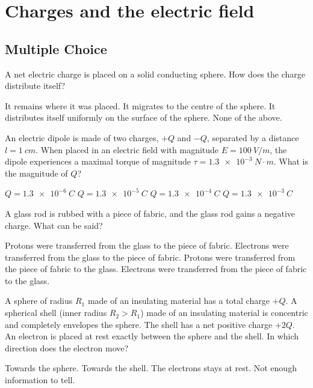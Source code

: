 \section{Charges and the electric field}

\subsection{Multiple Choice}

\question A net electric charge is placed on a solid conducting sphere. How does the charge distribute itself?
\begin{checkboxes}
	\choice It remains where it was placed.
	\choice It migrates to the centre of the sphere. 
	\CorrectChoice It distributes itself uniformly on the surface of the sphere. 
	\choice None of the above.  
\end{checkboxes}

\question An electric dipole is made of two charges, $+Q$ and $-Q$, separated by a distance $l=\SI{1}{cm}$. When placed in an electric field with magnitude $E=\SI{100}{V/m}$, the dipole experiences a maximal torque of magnitude $\tau=\SI{1.3e-3}{N\cdot m}$. What is the magnitude of $Q$?
\begin{checkboxes}
	\choice $Q=\SI{1.3e-6}{C}$
	\choice $Q=\SI{1.3e-5}{C}$
	\choice $Q=\SI{1.3e-4}{C}$
	\CorrectChoice $Q=\SI{1.3e-3}{C}$
\end{checkboxes}

\question  A glass rod is rubbed with a piece of fabric, and the glass rod gains a negative charge. What can be said?
\begin{checkboxes}
	\choice Protons were transferred from the glass to the piece of fabric.
	\choice Electrons were transferred from the glass to the piece of fabric.
	\choice Protons were transferred from the piece of fabric to the glass.
	\CorrectChoice Electrons were transferred from the piece of fabric to the glass.
\end{checkboxes}

\question A sphere of radius $R_1$ made of an insulating material has a total charge $+Q$. A spherical shell (inner radius $R_2>R_1$) made of an insulating material is concentric and completely envelopes the sphere. The shell has a net positive charge $+2Q$. An electron is placed at rest exactly between the sphere and the shell. In which direction does the electron move? 
\begin{checkboxes}
	\CorrectChoice Towards the sphere.
	\choice Towards the shell. 
	\choice The electrons stays at rest. 
	\choice Not enough information to tell. 
\end{checkboxes}

